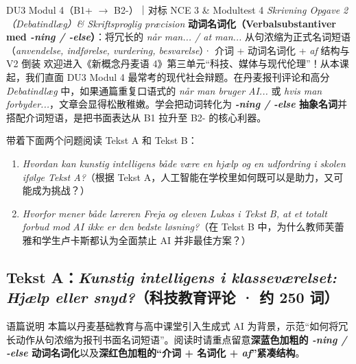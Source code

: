 {DU3 Modul 4（B1+ $\rightarrow$ B2-）｜对标 NCE 3 \& Modultest 4 \textit{Skrivning Opgave 2（Debatindlæg）\& Skriftsproglig præcision}}
{\textbf{动词名词化（Verbalsubstantiver med \textit{-ning / -else}）}：将冗长的 \textit{når man... / at man...} 从句浓缩为正式名词短语（\textit{anvendelse, indførelse, vurdering, besvarelse}）· 介词 + 动词名词化 + \textit{af} 结构与 V2 倒装}
{欢迎进入《新概念丹麦语 4》第三单元“科技、媒体与现代伦理”！从本课起，我们直面 DU3 Modul 4 最常考的现代社会辩题。在丹麦报刊评论和高分 \textit{Debatindlæg} 中，如果通篇重复口语式的 \textit{når man bruger AI...} 或 \textit{hvis man forbyder...}，文章会显得松散稚嫩。学会把动词转化为 \textbf{\textit{-ning / -else} 抽象名词}并搭配介词短语，是把书面表达从 B1 拉升至 B2- 的核心利器。}

\begin{foerduleaeser}
带着下面两个问题阅读 Tekst A 和 Tekst B：
\begin{enumerate}
  \item \textit{Hvordan kan kunstig intelligens både være en hjælp og en udfordring i skolen ifølge Tekst A?}（根据 Tekst A，人工智能在学校里如何既可以是助力，又可能成为挑战？）
  \item \textit{Hvorfor mener både læreren Freja og eleven Lukas i Tekst B, at et totalt forbud mod AI ikke er den bedste løsning?}（在 Tekst B 中，为什么教师芙蕾雅和学生卢卡斯都认为全面禁止 AI 并非最佳方案？）
\end{enumerate}
\end{foerduleaeser}


\subsection*{Tekst A：\textit{Kunstig intelligens i klasseværelset: Hjælp eller snyd?}（科技教育评论 · 约 250 词）}

\begin{tipbox}{语篇说明}
本篇以丹麦基础教育与高中课堂引入生成式 AI 为背景，示范“如何将冗长动作从句浓缩为报刊书面名词短语”。阅读时请重点留意\textbf{\color{NCDNavy}深蓝色加粗的 \textit{-ning / -else} 动词名词化}以及\textbf{\color{NCDRed}深红色加粗的“介词 + 名词化 + \textit{af}”紧凑结构}。
\end{tipbox}

